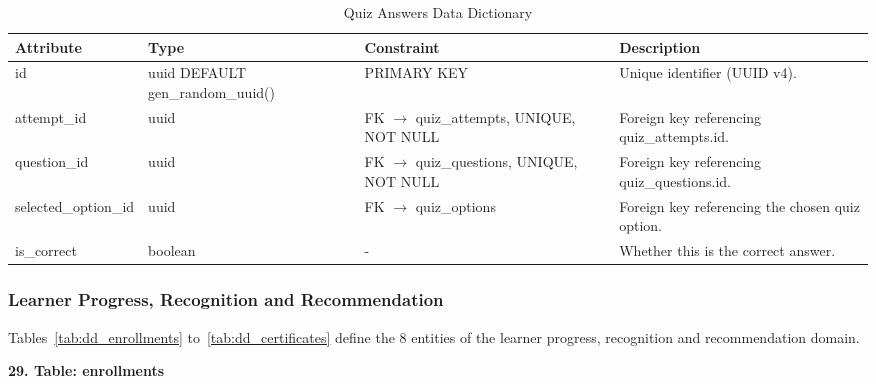 \documentclass[12pt, oneside]{article} %
\newcommand{\tabbreak}{\hyphenpenalty=200\exhyphenpenalty=200\tolerance=4000\hbadness=10000\hspace{0pt}}
\begin{document}
\begin{table}[H]
\caption{Quiz Answers Data Dictionary}
\label{tab:dd_quiz_answers}
\vspace{-4mm}
\begin{center}
\renewcommand{\arraystretch}{1.15}
\scriptsize
\begin{tabular}{|>{\raggedright\arraybackslash\tabbreak}p{2.67cm}|>{\raggedright\arraybackslash\tabbreak}p{2.93cm}|>{\raggedright\arraybackslash\tabbreak}p{2.67cm}|>{\raggedright\arraybackslash\tabbreak}p{4.51cm}|}
\hline
\textbf{Attribute} & \textbf{Type} & \textbf{Constraint} & \textbf{Description} \\ \hline
id & uuid DEFAULT gen\_random\_uuid() & PRIMARY KEY & Unique identifier (UUID v4). \\ \hline
attempt\_id & uuid & FK $\rightarrow$ quiz\_attempts, UNIQUE, NOT NULL & Foreign key referencing quiz\_attempts.id. \\ \hline
question\_id & uuid & FK $\rightarrow$ quiz\_questions, UNIQUE, NOT NULL & Foreign key referencing quiz\_questions.id. \\ \hline
selected\_option\_id & uuid & FK $\rightarrow$ quiz\_options & Foreign key referencing the chosen quiz option. \\ \hline
is\_correct & boolean & - & Whether this is the correct answer. \\ \hline
\end{tabular}
\end{center}
\end{table}

\subsubsection{Learner Progress, Recognition and Recommendation}

Tables~\ref{tab:dd_enrollments} to~\ref{tab:dd_certificates} define the 8 entities of the learner progress, recognition and recommendation domain.

\textbf{29. Table: enrollments}
\end{document}
